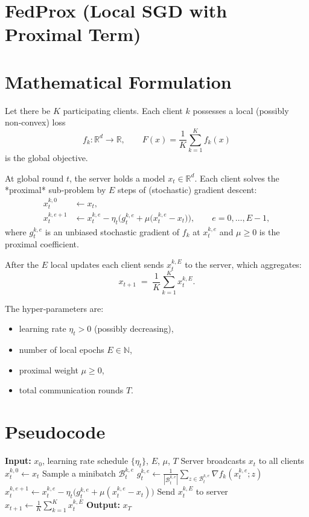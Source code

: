 \documentclass{article}
\begin{document}
\section*{FedProx (Local SGD with Proximal Term)}

\section*{Mathematical Formulation}
Let there be $K$ participating clients.  
Each client $k$ possesses a local (possibly non‑convex) loss
\[
f_k:\mathbb{R}^d\rightarrow\mathbb{R},\qquad 
F(x)=\frac1K\sum_{k=1}^{K}f_k(x)
\]
is the global objective.  

At global round $t$, the server holds a model $x_t\in\mathbb{R}^d$.  
Each client solves the *proximal* sub‑problem by $E$ steps of (stochastic) gradient descent:
\[
\begin{aligned}
x_{t}^{k,0}&\gets x_t,\\
x_{t}^{k,e+1}&\gets x_{t}^{k,e}-\eta_t\Big(g_{t}^{k,e}+ \mu\big(x_{t}^{k,e}-x_t\big)\Big),
\qquad e=0,\dots,E-1,
\end{aligned}
\]
where $g_{t}^{k,e}$ is an unbiased stochastic gradient of $f_k$ at $x_{t}^{k,e}$ and $\mu\ge0$ is the proximal coefficient.  

After the $E$ local updates each client sends $x_{t}^{k,E}$ to the server, which aggregates:
\[
x_{t+1}\;=\;\frac1K\sum_{k=1}^{K}x_{t}^{k,E}.
\]

The hyper‑parameters are:
\begin{itemize}[noitemsep]
\item learning rate $\eta_t>0$ (possibly decreasing),
\item number of local epochs $E\in\mathbb{N}$,
\item proximal weight $\mu\ge0$,
\item total communication rounds $T$.
\end{itemize}

\section*{Pseudocode}
\begin{algorithm}[H]
\caption{FedProx}
\begin{algorithmic}[1]
\State \textbf{Input:} $x_0$, learning rate schedule $\{\eta_t\}$, $E$, $\mu$, $T$
    \State Server broadcasts $x_t$ to all clients
        \State $x_{t}^{k,0}\gets x_t$
            \State Sample a minibatch $\mathcal{B}_{t}^{k,e}$
            \State $g_{t}^{k,e}\gets \frac1{|\mathcal{B}_{t}^{k,e}|}
                 \sum_{z\in\mathcal{B}_{t}^{k,e}}\nabla f_k(x_{t}^{k,e};z)$
            \State $x_{t}^{k,e+1}\gets x_{t}^{k,e}
                -\eta_t\big(g_{t}^{k,e}+ \mu(x_{t}^{k,e}-x_t)\big)$
        \EndFor
        \State Send $x_{t}^{k,E}$ to server
    \EndFor
    \State $x_{t+1}\gets \frac1K\sum_{k=1}^{K}x_{t}^{k,E}$
\EndFor
\State \textbf{Output:} $x_T$
\end{algorithmic}
\end{algorithm}
\end{document}
